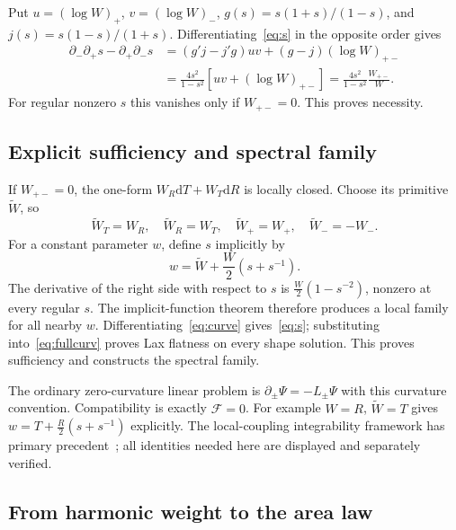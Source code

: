 \documentclass[11pt]{article}
\newcommand{\dd}{\mathrm d}
\newcommand{\cF}{\mathcal F}
\begin{document}
Put $u=(\log W)_+$, $v=(\log W)_-$, $g(s)=s(1+s)/(1-s)$, and $j(s)=s(1-s)/(1+s)$. Differentiating~\eqref{eq:s} in the opposite order gives
\begin{align}
 \partial_-\partial_+s-\partial_+\partial_-s
 &=(g'j-j'g)uv+(g-j)(\log W)_{+-}\\
 &=\frac{4s^2}{1-s^2}\left[uv+(\log W)_{+-}\right]
 =\frac{4s^2}{1-s^2}\frac{W_{+-}}W.\label{eq:frob}
\end{align}
For regular nonzero $s$ this vanishes only if $W_{+-}=0$. This proves necessity.

\subsection{Explicit sufficiency and spectral family}

If $W_{+-}=0$, the one-form $W_R\dd T+W_T\dd R$ is locally closed. Choose its primitive $\widetilde W$, so
\begin{equation}
 \widetilde W_T=W_R,\quad\widetilde W_R=W_T,
 \quad\widetilde W_+=W_+,\quad\widetilde W_-=-W_-.
\end{equation}
For a constant parameter $w$, define $s$ implicitly by
\begin{equation}\label{eq:curve}
 \boxed{w=\widetilde W+\frac W2(s+s^{-1}).}
\end{equation}
The derivative of the right side with respect to $s$ is $\tfrac W2(1-s^{-2})$, nonzero at every regular $s$. The implicit-function theorem therefore produces a local family for all nearby $w$. Differentiating~\eqref{eq:curve} gives~\eqref{eq:s}; substituting into~\eqref{eq:fullcurv} proves Lax flatness on every shape solution. This proves sufficiency and constructs the spectral family.

The ordinary zero-curvature linear problem is $\partial_\pm\Psi=-L_\pm\Psi$ with this curvature convention. Compatibility is exactly $\cF=0$. For example $W=R$, $\widetilde W=T$ gives $w=T+\tfrac R2(s+s^{-1})$ explicitly. The local-coupling integrability framework has primary precedent~\cite{Hoare}; all identities needed here are displayed and separately verified.

\subsection{From harmonic weight to the area law}
\end{document}
